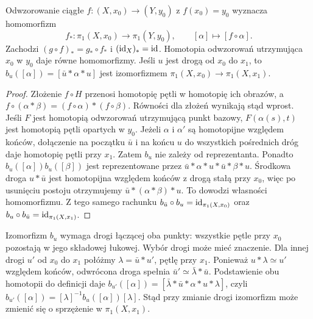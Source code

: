 \begin{stwierdzenie}
\label{prop:pi1-funktor}
Odwzorowanie ciągłe $f:(X,x_0)\to(Y,y_0)$
z $f(x_0)=y_0$ wyznacza homomorfizm
\[
 f_*:\pi_1(X,x_0)\to\pi_1(Y,y_0),
 \qquad [\alpha]\mapsto[f\circ\alpha].
\]
Zachodzi $(g\circ f)_*=g_*\circ f_*$ i
$(\mathrm{id}_X)_*=\mathrm{id}$. Homotopia odwzorowań
utrzymująca $x_0$ w $y_0$ daje
równe homomorfizmy. Jeśli
$u$ jest drogą od $x_0$ do $x_1$,
to $b_u([\alpha])=[\bar u*\alpha*u]$
jest izomorfizmem
$\pi_1(X,x_0)\to\pi_1(X,x_1)$.
\end{stwierdzenie}
\begin{proof}
Złożenie $f\circ H$ przenosi homotopię
pętli w homotopię ich obrazów, a
$f\circ(\alpha*\beta)
=(f\circ\alpha)*(f\circ\beta)$.
Równości dla złożeń wynikają stąd wprost.
Jeśli $F$ jest homotopią odwzorowań utrzymującą
punkt bazowy, $F(\alpha(s),t)$ jest
homotopią pętli opartych w $y_0$.
Jeżeli $\alpha$ i $\alpha'$ są homotopijne
względem końców, dołączenie na początku
$\bar u$ i na końcu $u$ do wszystkich
pośrednich dróg daje homotopię pętli przy $x_1$.
Zatem $b_u$ nie zależy od reprezentanta.
Ponadto $b_u([\alpha])b_u([\beta])$ jest
reprezentowane przez
$\bar u*\alpha*u*\bar u*\beta*u$.
Środkowa droga $u*\bar u$ jest homotopijna
względem końców z drogą stałą przy $x_0$,
więc po usunięciu postoju otrzymujemy
$\bar u*(\alpha*\beta)*u$.
To dowodzi własności homomorfizmu.
Z tego samego rachunku
$b_{\bar u}\circ b_u=\mathrm{id}_{\pi_1(X,x_0)}$
oraz $b_u\circ b_{\bar u}=\mathrm{id}_{\pi_1(X,x_1)}$.
\end{proof}

Izomorfizm $b_u$ wymaga drogi łączącej oba punkty:
wszystkie pętle przy $x_0$ pozostają w jego
składowej łukowej. Wybór drogi może mieć znaczenie.
Dla innej drogi $u'$ od $x_0$ do $x_1$ połóżmy
$\lambda=\bar u*u'$, pętlę przy $x_1$.
Ponieważ $u*\lambda\simeq u'$ względem końców,
odwrócona droga spełnia
$\bar u'\simeq\bar\lambda*\bar u$.
Podstawienie obu homotopii do definicji daje
$b_{u'}([\alpha])=[\bar\lambda*\bar u*\alpha*u*\lambda]$,
czyli
$b_{u'}([\alpha])=[\lambda]^{-1}b_u([\alpha])[\lambda]$.
Stąd przy zmianie drogi izomorfizm może zmienić
się o sprzężenie w $\pi_1(X,x_1)$.

